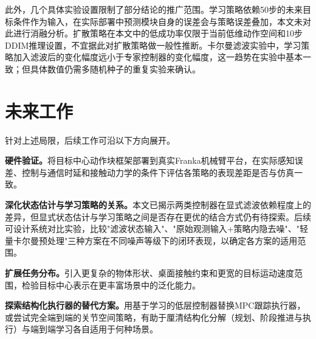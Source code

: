 此外，几个具体实验设置限制了部分结论的推广范围。学习策略依赖50步的未来目标条件作为输入，在实际部署中预测模块自身的误差会与策略误差叠加，本文未对此进行消融分析。扩散策略在本文中的低成功率仅限于当前低维动作空间和10步DDIM推理设置，不宜据此对扩散策略做一般性推断。卡尔曼滤波实验中，学习策略加入滤波后的变化幅度远小于专家控制器的变化幅度，这一趋势在实验中基本一致；但具体数值仍需多随机种子的重复实验来确认。

\section{未来工作}

针对上述局限，后续工作可沿以下方向展开。

\textbf{硬件验证。}将目标中心动作块框架部署到真实Franka机械臂平台，在实际感知误差、控制与通信时延和接触动力学的条件下评估各策略的表现差距是否与仿真一致。

\textbf{深化状态估计与学习策略的关系。}本文已揭示两类控制器在显式滤波依赖程度上的差异，但显式状态估计与学习策略之间是否存在更优的结合方式仍有待探索。后续可设计系统对比实验，比较"滤波状态输入"、"原始观测输入+策略内隐去噪"、"轻量卡尔曼预处理"三种方案在不同噪声等级下的闭环表现，以确定各方案的适用范围。

\textbf{扩展任务分布。}引入更复杂的物体形状、桌面接触约束和更宽的目标运动速度范围，检验目标中心表示在更丰富场景中的泛化能力。

\textbf{探索结构化执行器的替代方案。}用基于学习的低层控制器替换MPC跟踪执行器，或尝试完全端到端的关节空间策略，有助于厘清结构化分解（规划、阶段推进与执行）与端到端学习各自适用于何种场景。
